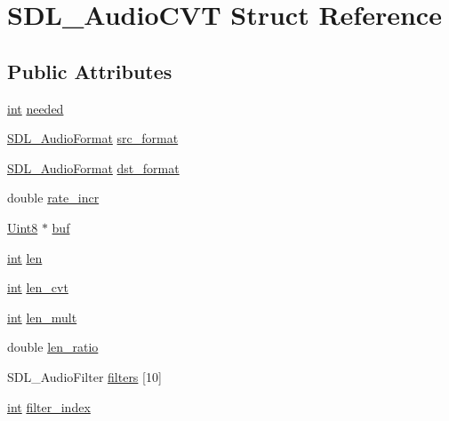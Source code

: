\hypertarget{struct_s_d_l___audio_c_v_t}{}\section{S\+D\+L\+\_\+\+Audio\+C\+V\+T Struct Reference}
\label{struct_s_d_l___audio_c_v_t}
\subsection*{Public Attributes}
\begin{DoxyCompactItemize}
\item 
\hyperlink{_s_d_l__thread_8h_a6a64f9be4433e4de6e2f2f548cf3c08e}{int} \hyperlink{struct_s_d_l___audio_c_v_t_ac600a035a48df05e14d3712fd6953ad4}{needed}
\item 
\hyperlink{_s_d_l__audio_8h_a491ed103fd25d920c4e6b7495217ce66}{S\+D\+L\+\_\+\+Audio\+Format} \hyperlink{struct_s_d_l___audio_c_v_t_a6ae81231e017105e6d5e745a51732e16}{src\+\_\+format}
\item 
\hyperlink{_s_d_l__audio_8h_a491ed103fd25d920c4e6b7495217ce66}{S\+D\+L\+\_\+\+Audio\+Format} \hyperlink{struct_s_d_l___audio_c_v_t_a8f890d017be857a3b048bf00525736c6}{dst\+\_\+format}
\item 
double \hyperlink{struct_s_d_l___audio_c_v_t_ad886122c23a6673073baace31bff3b6c}{rate\+\_\+incr}
\item 
\hyperlink{_s_d_l__stdinc_8h_a2944638813a090aa23e62f4da842c3e2}{Uint8} $\ast$ \hyperlink{struct_s_d_l___audio_c_v_t_a080db27b929efa983c5161360ffce310}{buf}
\item 
\hyperlink{_s_d_l__thread_8h_a6a64f9be4433e4de6e2f2f548cf3c08e}{int} \hyperlink{struct_s_d_l___audio_c_v_t_aeaeb8c5a63c3ab96471fbfdf412c78ff}{len}
\item 
\hyperlink{_s_d_l__thread_8h_a6a64f9be4433e4de6e2f2f548cf3c08e}{int} \hyperlink{struct_s_d_l___audio_c_v_t_a5c60163f34d1947e5b166c23aba9879d}{len\+\_\+cvt}
\item 
\hyperlink{_s_d_l__thread_8h_a6a64f9be4433e4de6e2f2f548cf3c08e}{int} \hyperlink{struct_s_d_l___audio_c_v_t_ac9662d47cf2348b82b27b151150116b0}{len\+\_\+mult}
\item 
double \hyperlink{struct_s_d_l___audio_c_v_t_a5628ff5ccf711de9d77c0a4a9f57d2f0}{len\+\_\+ratio}
\item 
S\+D\+L\+\_\+\+Audio\+Filter \hyperlink{struct_s_d_l___audio_c_v_t_aeec0ebddc5e142bbafcc94a6014ad23e}{filters} \mbox{[}10\mbox{]}
\item 
\hyperlink{_s_d_l__thread_8h_a6a64f9be4433e4de6e2f2f548cf3c08e}{int} \hyperlink{struct_s_d_l___audio_c_v_t_a35093b3ad3331c17416c593a76012b63}{filter\+\_\+index}
\end{DoxyCompactItemize}


